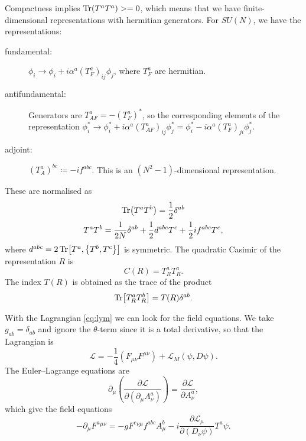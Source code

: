 Compactness implies $\Tr(T^a T^a) > =0 $, which means that we have finite-dimensional representations with hermitian generators.
For $SU(N)$, we have the representations:
\begin{description}
  \item[fundamental:] $\phi_i \to \phi_i + i \alpha^a (T^a_F)_{ij} \phi_j$, where $T_F^a$ are hermitian.
  \item[antifundamental:] Generators are $T_{AF}^a = - (T^a_F)^*$, so the corresponding elements of the representation $\phi_i^* \to \phi_i^* + i \alpha^a (T^a_{AF})_{ij} \phi^*_j = \phi^*_i - i \alpha^a (T_F^a)_{ji} \phi^*_j$.
  \item[adjoint:] $(T_A^a)^{bc} \coloneqq -i f^{abc}$. This is an $(N^2 - 1)$-dimensional representation.
\end{description}
These are normalised as
\begin{gather}
  \Tr(T^a T^b) = \frac{1}{2} \delta^{ab} \\
  T^a T^b = \frac{1}{2 N} \delta^{ab} + \frac{1}{2} d^{abc} T^c + \frac{1}{2} i f^{abc} T^c,
\end{gather}
where $d^{abc} = 2 \Tr[T^a, \left\{ T^b, T^c \right\}]$ is symmetric.
The quadratic Casimir of the representation $R$ is
\begin{equation}
  C(R) = T^a_R T^a_R.
\end{equation}
The index $T(R)$ is obtained as the trace of the product
\begin{equation}
  \Tr[T^a_R T^b_R] = T(R) \delta^{ab}.
\end{equation}

With the Lagrangian \eqref{eq:lym} we can look for the field equations.
We take $g_{ab} =\delta_{ab}$ and ignore the $\theta$-term since it is a total derivative, so that the Lagrangian is
\begin{equation}
  \mathscr{L} = -\frac{1}{4} (F_{\mu\nu} F^{\mu\nu}) + \mathscr{L}_M (\psi, D \psi).
\end{equation}
The Euler--Lagrange equations are
\begin{equation}
  \partial_{\mu} \left( \frac{\partial  \mathscr{L}}{\partial (\partial_{\mu} A^a_{\nu})} \right) = \frac{\partial \mathscr{L}}{\partial A_{\nu}^a}, 
\end{equation}
which give the field equations
\begin{equation}
  -\partial_{\mu} F^a{}^{\mu\nu} = -g F^c{}^{\nu\mu} f^{abc} A^{b}_{\mu} - i \frac{\partial \mathscr{L}_{\mu}}{\partial (D_{\nu} \psi)} T^a \psi.
\end{equation}

